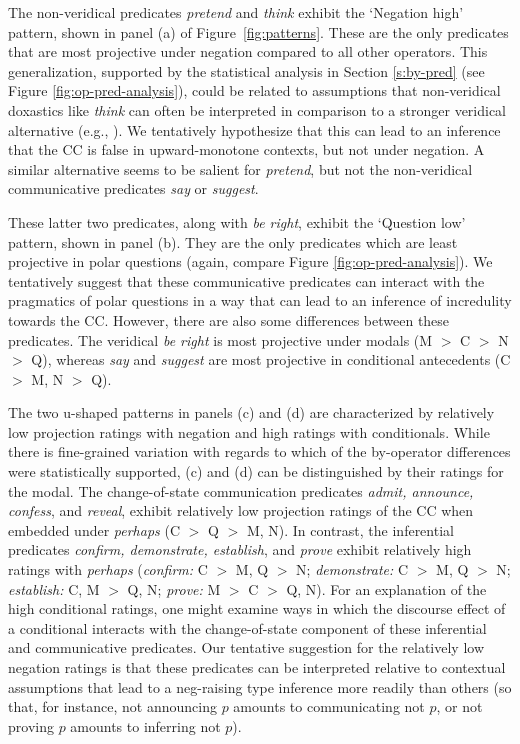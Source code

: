 \documentclass[a4paper,12pt,twoside]{article}
\begin{document}
	
	The non-veridical predicates \emph{pretend} and \emph{think} exhibit the `Negation high' pattern, shown in panel (a) of Figure~\ref{fig:patterns}. These are the only predicates that are most projective under negation compared to all other operators. This generalization, supported by the statistical analysis in Section \ref{s:by-pred} (see Figure \ref{fig:op-pred-analysis}), could be related to assumptions that non-veridical doxastics like \emph{think} can often be interpreted in comparison to a stronger veridical alternative (e.g., \citealt{heim_artikel_1991,chemla_epistemic_2008}). We tentatively hypothesize that this can lead to an inference that the CC is false in upward-monotone contexts, but not under negation. A similar alternative seems to be salient for \emph{pretend}, but not the non-veridical communicative predicates \emph{say} or \emph{suggest}.

	These latter two predicates, along with \emph{be right}, exhibit the `Question low' pattern, shown in panel (b). They are the only predicates which are least projective in polar questions (again, compare Figure \ref{fig:op-pred-analysis}). We tentatively suggest that these communicative predicates can interact with the pragmatics of polar questions in a way that can lead to an inference of incredulity towards the CC. However, there are also some differences between these predicates. The veridical \emph{be right} is most projective under modals (M $>$ C $>$ N $>$ Q), whereas \emph{say} and \emph{suggest} are most projective in conditional antecedents (C $>$ M,  N $>$ Q).

	The two u-shaped patterns in panels (c) and (d) are characterized by relatively low projection ratings with negation and high ratings with conditionals. While there is fine-grained variation with regards to which of the by-operator differences were statistically supported, (c) and (d) can be distinguished by their ratings for the modal. 
	The change-of-state communication predicates \emph{admit, announce, confess}, and \emph{reveal}, exhibit relatively low projection ratings of the CC when embedded under \emph{perhaps} (C $>$ Q  $>$ M, N). In contrast, the inferential predicates \emph{confirm, demonstrate, establish}, and \emph{prove} exhibit relatively high ratings with \emph{perhaps} (\emph{confirm:} C $>$ M, Q $>$ N; \emph{demonstrate:} C $>$ M, Q $>$ N; \emph{establish:} C, M $>$ Q, N; \emph{prove:} M $>$ C  $>$ Q, N). For an explanation of the high conditional ratings, one might examine ways in which the discourse effect of a conditional interacts with the change-of-state component of these inferential and communicative predicates. Our tentative suggestion for the relatively low negation ratings is that these predicates can be interpreted relative to contextual assumptions that lead to a neg-raising type inference more readily than others (so that, for instance, not announcing $p$ amounts to communicating not $p$, or not proving $p$ amounts to inferring not $p$).
	
\end{document}
